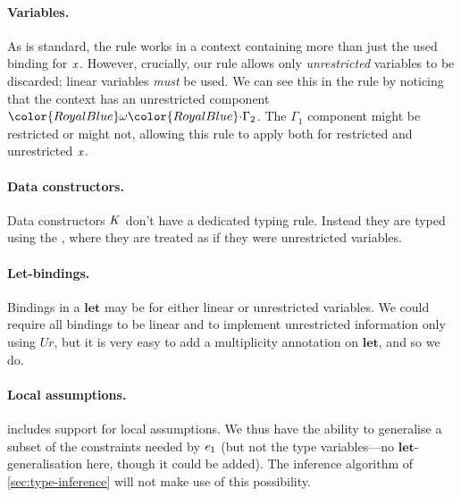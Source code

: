 \documentclass[acmsmall,usenames,dvipsnames,natbib=false,acmthm=false,screen]{acmart}
\newcommand{\Conid}[1]{\mathit{#1}}
\newcommand{\constraintcolour}{\color{RoyalBlue}}
\newcommand{\constraintfont}[1]{{\constraintcolour#1}}
\newcommand{\multiplicitycolour}{\color{RoyalBlue}}
\newcommand{\multiplicityfont}[1]{{\multiplicitycolour#1}}
\newcommand{\scale}{\constraintfont{\cdot}}
\theoremstyle{acmplain}
\theoremstyle{acmdefinition}
\begin{document}
\paragraph{Variables.}
As is standard, the  rule works in a context containing more
than just the used binding for $ \mathit{x} $. However, crucially,
our rule allows only
\emph{unrestricted} variables to be discarded; linear variables \emph{must} be
used. We can see this in the rule by noticing that the context has an unrestricted
component $   \multiplicityfont{ \omega }  \scale \Gamma_{{\mathrm{2}}}  $. The $ \Gamma_{{\mathrm{1}}} $ component might be restricted or might not,
allowing this rule to apply both for restricted and unrestricted $ \mathit{x} $.

\paragraph{Data constructors.}
Data constructors $ \mathit{K} $ don't have a dedicated typing
rule. Instead they are typed using the , where they are
treated as if they were unrestricted variables.

\paragraph{Let-bindings.}
Bindings in a \ensuremath{\mathbf{let}} may be for either linear or unrestricted variables.
  We could require all bindings to be linear and to implement unrestricted
  information only using \ensuremath{\Conid{Ur}}, but it is very easy to add a multiplicity
  annotation on \ensuremath{\mathbf{let}}, and so we do.

\paragraph{Local assumptions.}
 includes support for local
  assumptions. We thus have the ability to generalise a subset of
  the constraints needed by $ \mathit{e_{{\mathrm{1}}}} $ (but not the type variables---no
  \ensuremath{\mathbf{let}}-generalisation here, though it could be added). The inference algorithm of
  \cref{sec:type-inference} will not make use of this
  possibility. %
\end{document}
